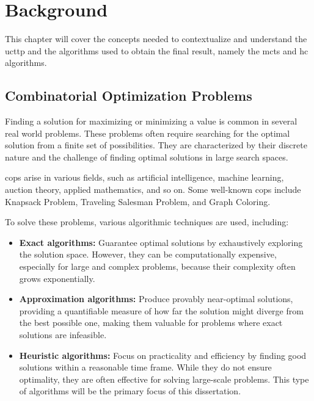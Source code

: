
\chapter{Background}


\label{Background}

This chapter will cover the concepts needed to contextualize and understand the \ac{ucttp} and the algorithms used to obtain the final result, namely the \ac{mcts} and \ac{hc} algorithms.


\section{Combinatorial Optimization Problems}

Finding a solution for maximizing or minimizing a value is common in several real world problems. These problems often require searching for the optimal solution from a finite set of possibilities. They are characterized by their discrete nature and the challenge of finding optimal solutions in large search spaces.

\acp{cop} arise in various fields, such as artificial intelligence, machine learning, auction theory, applied mathematics, and so on. Some well-known \acp{cop} include Knapsack Problem, Traveling Salesman Problem, and Graph Coloring. 

To solve these problems, various algorithmic techniques are used, including:
\begin{itemize}
\item \textbf{Exact algorithms:} Guarantee optimal solutions by exhaustively exploring the solution space. However, they can be computationally expensive, especially for large and complex problems, because their complexity often grows exponentially.
\item \textbf{Approximation algorithms:} Produce provably near-optimal solutions, providing a quantifiable measure of how far the solution might diverge from the best possible one, making them valuable for problems where exact solutions are infeasible.
\item \textbf{Heuristic algorithms:} Focus on practicality and efficiency by finding good solutions within a reasonable time frame. While they do not ensure optimality, they are often effective for solving large-scale problems. This type of algorithms will be the primary focus of this dissertation.
\end{itemize}

